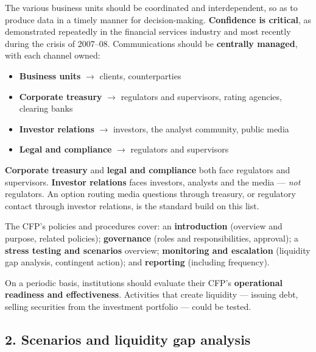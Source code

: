 \begin{lrkeybox}
The various business units should be coordinated and interdependent, so as to produce data in a timely manner for decision-making. \textbf{Confidence is critical}, as demonstrated repeatedly in the financial services industry and most recently during the crisis of 2007--08. Communications should be \textbf{centrally managed}, with each channel owned:
\begin{itemize}
\item \textbf{Business units} $\rightarrow$ clients, counterparties
\item \textbf{Corporate treasury} $\rightarrow$ regulators and supervisors, rating agencies, clearing banks
\item \textbf{Investor relations} $\rightarrow$ investors, the analyst community, public media
\item \textbf{Legal and compliance} $\rightarrow$ regulators and supervisors
\end{itemize}
\end{lrkeybox}

\begin{lrtrapbox}
\textbf{Corporate treasury} and \textbf{legal and compliance} both face regulators and supervisors. \textbf{Investor relations} faces investors, analysts and the media --- \emph{not} regulators. An option routing media questions through treasury, or regulatory contact through investor relations, is the standard build on this list.
\end{lrtrapbox}

\begin{lrkeybox}
The CFP's policies and procedures cover: an \textbf{introduction} (overview and purpose, related policies); \textbf{governance} (roles and responsibilities, approval); a \textbf{stress testing and scenarios} overview; \textbf{monitoring and escalation} (liquidity gap analysis, contingent action); and \textbf{reporting} (including frequency).

On a periodic basis, institutions should evaluate their CFP's \textbf{operational readiness and effectiveness}. Activities that create liquidity --- issuing debt, selling securities from the investment portfolio --- could be tested.
\end{lrkeybox}

\subsection{2. Scenarios and liquidity gap analysis}

